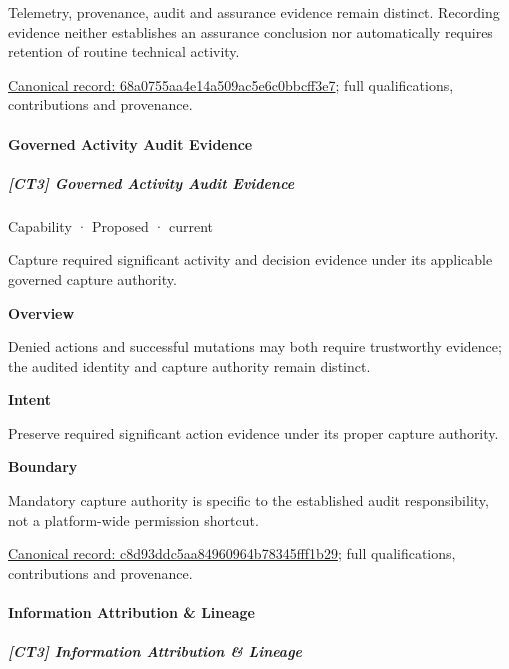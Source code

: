 Telemetry, provenance, audit and assurance evidence remain distinct. Recording evidence neither establishes an assurance conclusion nor automatically requires retention of routine technical activity.


{\footnotesize \href{../../../../continuum/strategy/capability/68a0755aa4e14a509ac5e6c0bbcff3e7.md}{Canonical record: 68a0755aa4e14a509ac5e6c0bbcff3e7}; full qualifications, contributions and provenance.}\par
\paragraph{Governed Activity Audit Evidence}

\subparagraph{[CT3] Governed Activity Audit Evidence}

\label{element:c8d93ddc5aa84960964b78345fff1b29}
{\small Capability · Proposed · current}\par

Capture required significant activity and decision evidence under its applicable governed capture authority.



\textbf{Overview}



Denied actions and successful mutations may both require trustworthy evidence; the audited identity and capture authority remain distinct.



\textbf{Intent}



Preserve required significant action evidence under its proper capture authority.



\textbf{Boundary}



Mandatory capture authority is specific to the established audit responsibility, not a platform-wide permission shortcut.


{\footnotesize \href{../../../../continuum/strategy/capability/c8d93ddc5aa84960964b78345fff1b29.md}{Canonical record: c8d93ddc5aa84960964b78345fff1b29}; full qualifications, contributions and provenance.}\par
\paragraph{Information Attribution \& Lineage}

\subparagraph{[CT3] Information Attribution \& Lineage}

